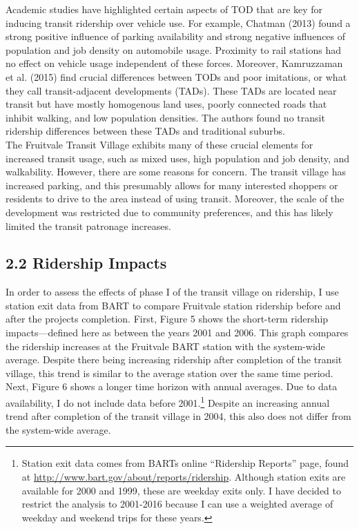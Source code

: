 \documentclass{article}
\begin{document}
\noindent
Academic studies have highlighted certain aspects of TOD that are key for inducing transit ridership over vehicle use. For example, Chatman (2013) found a strong positive influence of parking availability and strong negative influences of population and job density on automobile usage. Proximity to rail stations had no effect on vehicle usage independent of these forces. Moreover, Kamruzzaman et al. (2015) find crucial differences between TODs and poor imitations, or what they call transit-adjacent developments (TADs). These TADs are located near transit but have mostly homogenous land uses, poorly connected roads that inhibit walking, and low population densities. The authors found no transit ridership differences between these TADs and traditional suburbs. \\

\noindent
The Fruitvale Transit Village exhibits many of these crucial elements for increased transit usage, such as mixed uses, high population and job density, and walkability. However, there are some reasons for concern. The transit village has increased parking, and this presumably allows for many interested shoppers or residents to drive to the area instead of using transit. Moreover, the scale of the development was restricted due to community preferences, and this has likely limited the transit patronage increases. \\

\subsection*{2.2 Ridership Impacts}

In order to assess the effects of phase I of the transit village on ridership, I use station exit data from BART to compare Fruitvale station ridership before and after the project\textquotesingle s completion. First, Figure 5 shows the short-term ridership impacts---defined here as between the years 2001 and 2006. This graph compares the ridership increases at the Fruitvale BART station with the system-wide average. Despite there being increasing ridership after completion of the transit village, this trend is similar to the average station over the same time period. Next, Figure 6 shows a longer time horizon with annual averages. Due to data availability, I do not include data before 2001.\footnote{Station exit data comes from BART\textquotesingle s online ``Ridership Reports'' page, found at \url{http://www.bart.gov/about/reports/ridership}. Although station exits are available for 2000 and 1999, these are weekday exits only. I have decided to restrict the analysis to 2001-2016 because I can use a weighted average of weekday and weekend trips for these years.}  Despite an increasing annual trend after completion of the transit village in 2004, this also does not differ from the system-wide average. \\
\end{document}
